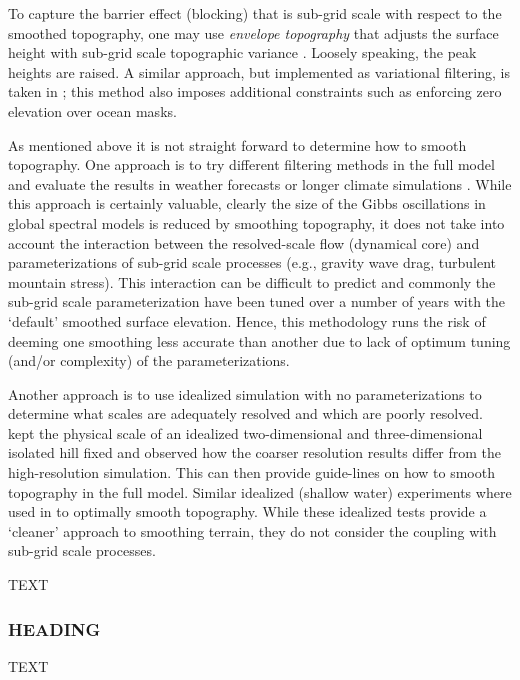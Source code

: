 \documentclass[gmd]{copernicus}
\begin{document}
To capture the barrier effect (blocking) that is sub-grid scale with respect to the smoothed topography, one may use {\em{envelope topography}} that adjusts the surface height with sub-grid scale topographic variance \citep{WTS1983QJRMS}. Loosely speaking, the peak heights are raised. A similar approach, but implemented as variational filtering, is taken in \cite{RTS2006QJRMS}; this method also imposes additional constraints such as enforcing zero elevation over ocean masks.

 
As mentioned above it is not straight forward to determine how to smooth topography. One approach is to try different filtering methods in the full model and evaluate the results in weather forecasts or longer climate simulations \citep{NSM1994JC,B1995QJRMS,H1996JC}. While this approach is certainly valuable, clearly the size of the Gibbs oscillations in global spectral models is reduced by smoothing topography, it does not take into account the interaction between the resolved-scale flow (dynamical core) and parameterizations of sub-grid scale processes (e.g., gravity wave drag, turbulent mountain stress). This interaction can be difficult to predict and commonly the sub-grid scale parameterization have been tuned over a number of years with the `default' smoothed surface elevation. Hence, this methodology runs the risk of deeming one smoothing less accurate than another due to lack of optimum tuning (and/or complexity) of the parameterizations.

Another approach is to use idealized simulation with no parameterizations to determine what scales are adequately resolved and which are poorly resolved. \cite{DB2001QJRMS} kept the physical scale of an idealized two-dimensional and three-dimensional isolated hill fixed and observed how the coarser resolution results differ from the high-resolution simulation. This can then provide guide-lines on how to smooth topography in the full model. Similar idealized (shallow water) experiments where used in \cite{RTS2006QJRMS} to optimally smooth topography. While these idealized tests provide a `cleaner' approach to smoothing terrain, they do not consider the coupling with sub-grid scale processes.







TEXT

\subsubsection{HEADING}
TEXT
\end{document}
